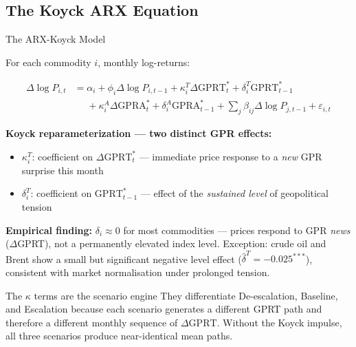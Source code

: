 ﻿\documentclass[aspectratio=1610]{beamer}
\begin{document}
\subsection{The Koyck ARX Equation}

\begin{frame}[shrink=10]{The ARX-Koyck Model}

  For each commodity $i$, monthly log-returns:

  \begin{align*}
    \Delta \log P_{i,t} &= \alpha_i
      + \phi_i \Delta \log P_{i,t-1}
      + \kappa_i^T \Delta \mathrm{GPRT}_t^*
      + \delta_i^T \mathrm{GPRT}_{t-1}^* \\
    &\phantom{{}={}}
      + \kappa_i^A \Delta \mathrm{GPRA}_t^*
      + \delta_i^A \mathrm{GPRA}_{t-1}^*
      + \sum_j \beta_{ij} \Delta \log P_{j,t-1}
      + \varepsilon_{i,t}
  \end{align*}

  \textbf{Koyck reparameterization --- two distinct GPR effects:}
  \begin{itemize}
    \item $\kappa_i^T$: coefficient on $\Delta\mathrm{GPRT}_t^*$ ---
          immediate price response to a \emph{new} GPR surprise this month
    \item $\delta_i^T$: coefficient on $\mathrm{GPRT}_{t-1}^*$ ---
          effect of the \emph{sustained level} of geopolitical tension
  \end{itemize}

  \textbf{Empirical finding:} $\delta_i \approx 0$ for most commodities ---
  prices respond to GPR \emph{news} ($\Delta$GPRT), not a permanently
  elevated index level. Exception: crude oil and Brent show a small but
  significant negative level effect ($\hat{\delta}^T = -0.025^{***}$),
  consistent with market normalisation under prolonged tension.

  \begin{alertblock}{The $\kappa$ terms are the scenario engine}
    They differentiate De-escalation, Baseline, and Escalation because each
    scenario generates a different GPRT path and therefore a different monthly
    sequence of $\Delta\mathrm{GPRT}$. Without the Koyck impulse, all three
    scenarios produce near-identical mean paths.
  \end{alertblock}

\end{frame}
\end{document}
